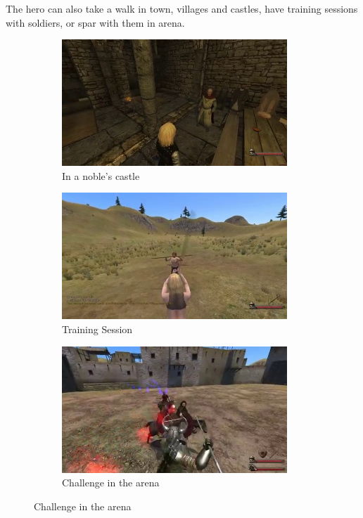 \documentclass[
]{article}
\begin{document}
The hero can also take a walk in town, villages and castles, have training sessions with soldiers, or spar with them in arena.


\begin{figure}
	\centering
	\begin{subfigure}[b]{0.3\textwidth}
		\includegraphics[width=\linewidth]{docimages/E_0055_00_33_54.jpg}
		\caption{In a noble's castle}
	\end{subfigure}
	\begin{subfigure}[b]{0.3\textwidth}
		\includegraphics[width=\linewidth]{docimages/E_0064_00_52_16.jpg}
		\caption{Training Session}
	\end{subfigure}
	\begin{subfigure}[b]{0.3\textwidth}
		\includegraphics[width=\linewidth]{docimages/E_0076_00_42_48.jpg}
		\caption{Challenge in the arena}
	\end{subfigure}
\end{figure}
\end{document}
